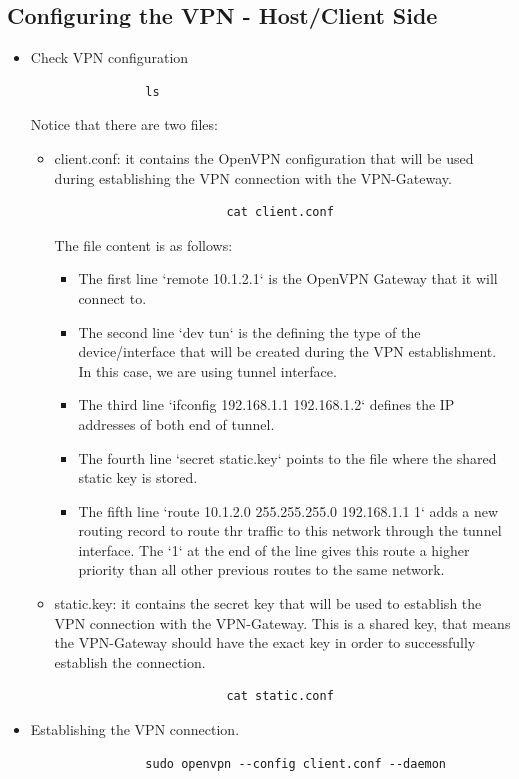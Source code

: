 \subsection{Configuring the VPN - Host/Client Side}
\begin{itemize}
	\item Check VPN configuration

		\begin{verbatim}
				ls
		\end{verbatim}

		Notice that there are two files:

		\begin{itemize}
			\item client.conf: it contains the OpenVPN  configuration that will be used during establishing the VPN connection with the VPN-Gateway.
				\begin{verbatim}
						cat client.conf
				\end{verbatim}

				The file content is as follows:
					\begin{itemize}
						\item The first line `remote 10.1.2.1` is the OpenVPN Gateway that it will connect to.
						\item The second line `dev tun` is the defining the type of the device/interface that will be created during the VPN establishment. In this case, we are using tunnel interface.
						\item The third line `ifconfig 192.168.1.1 192.168.1.2` defines the IP addresses of both end of tunnel.
						\item The fourth line `secret static.key` points to the file where the shared static key is stored.
						\item The fifth line `route 10.1.2.0 255.255.255.0 192.168.1.1 1` adds a new routing record to route thr traffic to this network through the tunnel interface. The `1` at the end of the line gives this route a higher priority than all other previous routes to the same network.
					\end{itemize}
			\item static.key: it contains the secret key that will be used to establish the VPN connection with the VPN-Gateway. This is a shared key, that means the VPN-Gateway should have the exact key in order to successfully establish the connection.
				\begin{verbatim}
						cat static.conf
				\end{verbatim}

		\end{itemize}

	\item Establishing the VPN connection.
		\begin{verbatim}
				sudo openvpn --config client.conf --daemon
		\end{verbatim}
\end{itemize}


